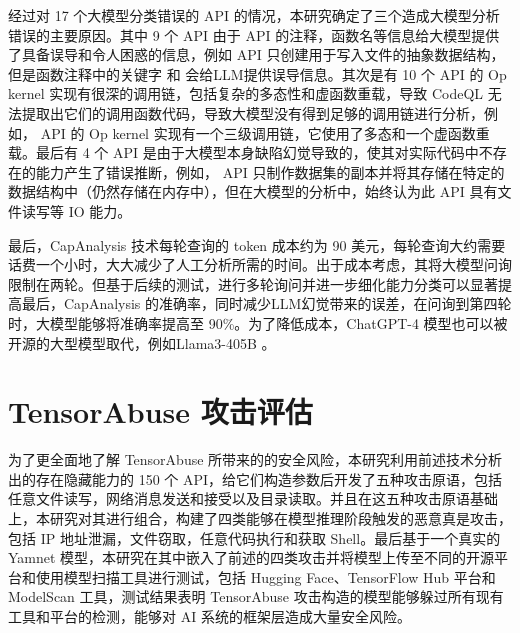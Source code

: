 经过对 17 个大模型分类错误的 API 的情况，本研究确定了三个造成大模型分析错误的主要原因。其中 9 个 API 由于 API 的注释，函数名等信息给大模型提供了具备误导和令人困惑的信息，例如  API 只创建用于写入文件的抽象数据结构，但是函数注释中的关键字  和  会给LLM提供误导信息。其次是有 10 个 API 的 Op kernel 实现有很深的调用链，包括复杂的多态性和虚函数重载，导致 CodeQL 无法提取出它们的调用函数代码，导致大模型没有得到足够的调用链进行分析，例如， API 的 Op kernel 实现有一个三级调用链，它使用了多态和一个虚函数重载。最后有 4 个 API 是由于大模型本身缺陷幻觉导致的，使其对实际代码中不存在的能力产生了错误推断，例如， API 只制作数据集的副本并将其存储在特定的数据结构中（仍然存储在内存中），但在大模型的分析中，始终认为此 API 具有文件读写等 IO 能力。

最后，CapAnalysis 技术每轮查询的 token 成本约为 90 美元，每轮查询大约需要话费一个小时，大大减少了人工分析所需的时间。出于成本考虑，其将大模型问询限制在两轮。但基于后续的测试，进行多轮询问并进一步细化能力分类可以显著提高最后，CapAnalysis 的准确率，同时减少LLM幻觉带来的误差，在问询到第四轮时，大模型能够将准确率提高至 90\%。为了降低成本，ChatGPT-4 模型也可以被开源的大型模型取代，例如Llama3-405B \cite{dubey2024llama3}。

\section{TensorAbuse 攻击评估}
为了更全面地了解 TensorAbuse 所带来的的安全风险，本研究利用前述技术分析出的存在隐藏能力的 150 个 API，给它们构造参数后开发了五种攻击原语，包括任意文件读写，网络消息发送和接受以及目录读取。并且在这五种攻击原语基础上，本研究对其进行组合，构建了四类能够在模型推理阶段触发的恶意真是攻击，包括 IP 地址泄漏，文件窃取，任意代码执行和获取 Shell。最后基于一个真实的 Yamnet 模型，本研究在其中嵌入了前述的四类攻击并将模型上传至不同的开源平台和使用模型扫描工具进行测试，包括 Hugging Face、TensorFlow Hub 平台和 ModelScan 工具，测试结果表明 TensorAbuse 攻击构造的模型能够躲过所有现有工具和平台的检测，能够对 AI 系统的框架层造成大量安全风险。

